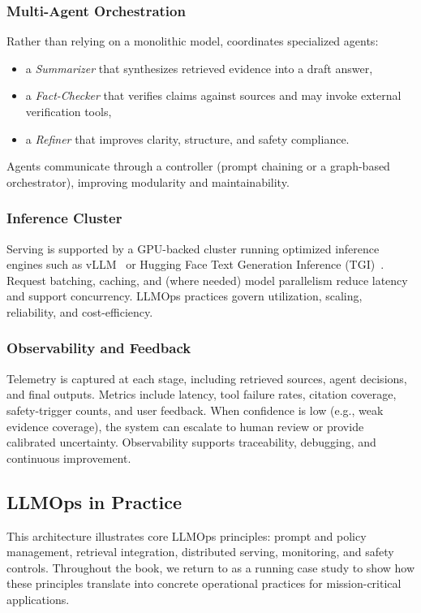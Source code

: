 \subsubsection{Multi-Agent Orchestration}
Rather than relying on a monolithic model, \ishtar{} coordinates specialized agents:
\begin{itemize}
  \item a \emph{Summarizer} that synthesizes retrieved evidence into a draft answer,
  \item a \emph{Fact-Checker} that verifies claims against sources and may invoke external verification tools,
  \item a \emph{Refiner} that improves clarity, structure, and safety compliance.
\end{itemize}
Agents communicate through a controller (prompt chaining or a graph-based orchestrator), improving modularity and maintainability.

\subsubsection{Inference Cluster}
Serving is supported by a GPU-backed cluster running optimized inference engines such as vLLM~\cite{Kwon2023vLLM} or Hugging Face Text Generation Inference (TGI)~\cite{tgi-whitepaper}. Request batching, caching, and (where needed) model parallelism reduce latency and support concurrency. LLMOps practices govern utilization, scaling, reliability, and cost-efficiency.

\subsubsection{Observability and Feedback}
Telemetry is captured at each stage, including retrieved sources, agent decisions, and final outputs. Metrics include latency, tool failure rates, citation coverage, safety-trigger counts, and user feedback. When confidence is low (e.g., weak evidence coverage), the system can escalate to human review or provide calibrated uncertainty. Observability supports traceability, debugging, and continuous improvement.

\FloatBarrier
\subsection{LLMOps in Practice}
This architecture illustrates core LLMOps principles: prompt and policy management, retrieval integration, distributed serving, monitoring, and safety controls. Throughout the book, we return to \ishtar{} as a running case study to show how these principles translate into concrete operational practices for mission-critical applications.

